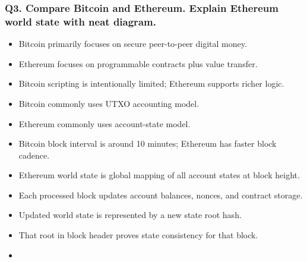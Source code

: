 \documentclass[12pt,a4paper]{article}
\begin{document}
\subsubsection*{Q3. Compare Bitcoin and Ethereum. Explain Ethereum world state with neat diagram.}
\begin{itemize}
\item Bitcoin primarily focuses on secure peer-to-peer digital money.
\item Ethereum focuses on programmable contracts plus value transfer.
\item Bitcoin scripting is intentionally limited; Ethereum supports richer logic.
\item Bitcoin commonly uses UTXO accounting model.
\item Ethereum commonly uses account-state model.
\item Bitcoin block interval is around 10 minutes; Ethereum has faster block cadence.
\item Ethereum world state is global mapping of all account states at block height.
\item Each processed block updates account balances, nonces, and contract storage.
\item Updated world state is represented by a new state root hash.
\item That root in block header proves state consistency for that block.
\item[]
\vspace{0.25em}
\noindent{}
\end{itemize}
\end{document}

